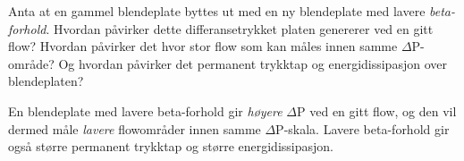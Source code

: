 

Anta at en gammel blendeplate byttes ut med en ny blendeplate med lavere {\it beta-forhold}. Hvordan påvirker dette differansetrykket platen genererer ved en gitt flow? Hvordan påvirker det hvor stor flow som kan måles innen samme $\Delta$P-område? Og hvordan påvirker det permanent trykktap og energidissipasjon over blendeplaten?







En blendeplate med lavere beta-forhold gir {\it høyere} $\Delta$P ved en gitt flow, og den vil dermed måle {\it lavere} flowområder innen samme $\Delta$P-skala. Lavere beta-forhold gir også større permanent trykktap og større energidissipasjon.








